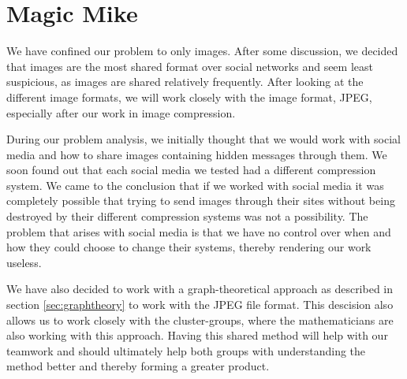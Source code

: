 \section{Magic Mike}
We have confined our problem to only images. After some discussion, we decided that images are the most shared format over social networks and seem least suspicious, as images are shared relatively frequently. After looking at the different image formats, we will work closely with the image format, JPEG, especially after our work in image compression. 

During our problem analysis, we initially thought that we would work with social media and how to share images containing hidden messages through them. We soon found out that each social media we tested had a different compression system. We came to the conclusion that if we worked with social media it was completely possible that trying to send images through their sites without being destroyed by their different compression systems was not a possibility. The problem that arises with social media is that we have no control over when and how they could choose to change their systems, thereby rendering our work useless.

We have also decided to work with a graph-theoretical approach as described in section \ref{sec:graphtheory} to work with the JPEG file format. This descision also allows us to work closely with the cluster-groups, where the mathematicians are also working with this approach. Having this shared method will help with our teamwork and should ultimately help both groups with understanding the method better and thereby forming a greater product.